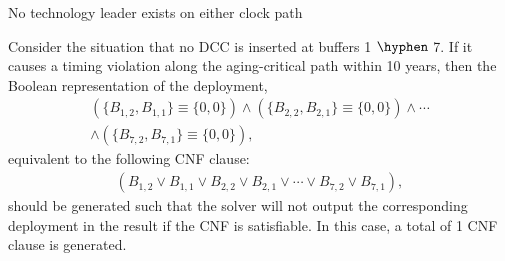 \setcounter{class}{0}
\begin{class}
\label{class:c4}
No technology leader exists on either clock path

Consider the situation that no DCC is inserted at buffers 1 $\hyphen$ 7. If it causes a timing violation along the aging-critical path within 10 years, then the Boolean representation of the deployment,
\begin{gather*}
\left(\{B_{1,2}, B_{1,1}\} \equiv \{0, 0\} \right) \land \left( \{B_{2,2}, B_{2,1}\} \equiv \{0, 0\} \right) \land \dotsb \\
\land \left( \{B_{7,2}, B_{7,1}\} \equiv \{0, 0\} \right),
\end{gather*}
equivalent to the following CNF clause:
\begin{gather*}
\left(B_{1,2} \lor B_{1,1} \lor B_{2,2} \lor B_{2,1} \lor \dotsb \lor B_{7,2} \lor B_{7,1} \right),
\end{gather*}
should be generated such that the solver will not output the corresponding deployment in the result if the CNF is satisfiable. In this case, a total of 1 CNF clause is generated.
\end{class}

